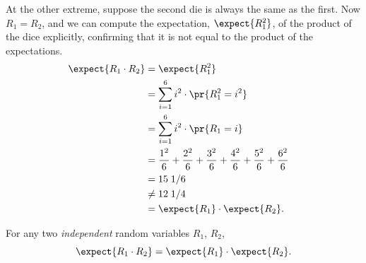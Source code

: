 At the other extreme, suppose the second die is always the same as the
first.  Now $R_1 = R_2$, and we can compute the expectation,
$\expect{R_1^2}$, of the product of the dice explicitly, confirming that
it is not equal to the product of the expectations.
\begin{align*}
\expect{R_1 \cdot R_2} & = \expect{R_1^2}\\
        & =    \sum_{i=1}^6 i^2 \cdot \pr{R_{1}^2 = i^2}
                    &  \\
        & =    \sum_{i=1}^6 i^2 \cdot \pr{R_{1} = i}\\
        & =    \frac{1^2}{6} + \frac{2^2}{6} + \frac{3^2}{6} + 
                \frac{4^2}{6} + \frac{5^2}{6} + \frac{6^2}{6} \\
        & =   15\; 1/6\\
        & \neq  12 \; 1/4\\
        & = \expect{R_1} \cdot \expect{R_2}.
\end{align*}

\begin{theorem}\label{th:prod}
For any two \emph{independent} random variables $R_1$, $R_2$,
\[
\expect{R_1 \cdot R_2} = \expect{R_1} \cdot \expect{R_2}.
\]
\end{theorem}

